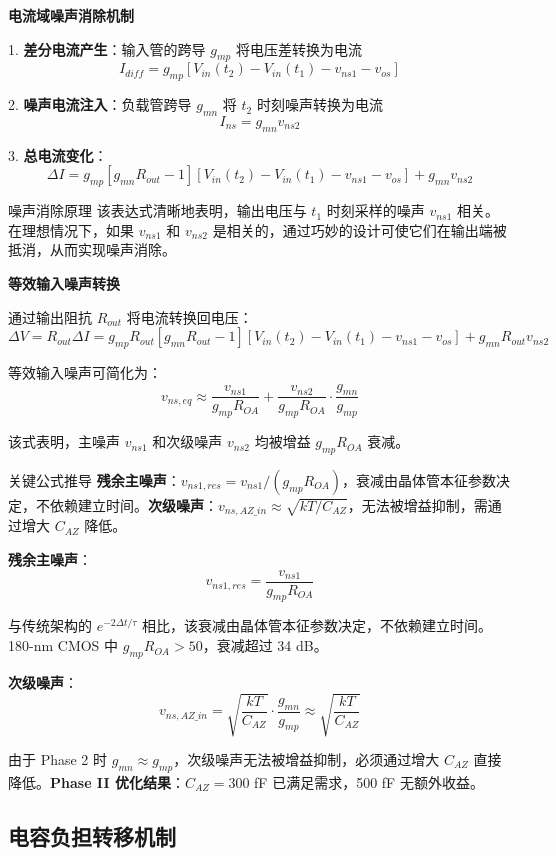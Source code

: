 \documentclass[11pt,a4paper,UTF8]{ctexart}
\begin{document}
\textbf{电流域噪声消除机制}

1. \textbf{差分电流产生}：输入管的跨导 $g_{mp}$ 将电压差转换为电流
   $$I_{diff} = g_{mp} [V_{in}(t_2) - V_{in}(t_1) - v_{ns1} - v_{os}]$$

2. \textbf{噪声电流注入}：负载管跨导 $g_{mn}$ 将 $t_2$ 时刻噪声转换为电流
   $$I_{ns} = g_{mn} v_{ns2}$$

3. \textbf{总电流变化}：
   $$\Delta I = g_{mp}[g_{mn}R_{out} - 1][V_{in}(t_2) - V_{in}(t_1) - v_{ns1} - v_{os}] + g_{mn}v_{ns2}$$

\begin{impbox}{噪声消除原理}
该表达式清晰地表明，输出电压与 $t_1$ 时刻采样的噪声 $v_{ns1}$ 相关。在理想情况下，如果 $v_{ns1}$ 和 $v_{ns2}$ 是相关的，通过巧妙的设计可使它们在输出端被抵消，从而实现噪声消除。
\end{impbox}

\textbf{等效输入噪声转换}

通过输出阻抗 $R_{out}$ 将电流转换回电压：
$$\Delta V = R_{out} \Delta I = g_{mp}R_{out}[g_{mn}R_{out} - 1][V_{in}(t_2) - V_{in}(t_1) - v_{ns1} - v_{os}] + g_{mn}R_{out}v_{ns2}$$

等效输入噪声可简化为：
$$v_{ns,eq} \approx \frac{v_{ns1}}{g_{mp}R_{OA}} + \frac{v_{ns2}}{g_{mp}R_{OA}} \cdot \frac{g_{mn}}{g_{mp}}$$

该式表明，主噪声 $v_{ns1}$ 和次级噪声 $v_{ns2}$ 均被增益 $g_{mp}R_{OA}$ 衰减。

\begin{prinbox}{关键公式推导}
\textbf{残余主噪声}：$v_{ns1,res} = v_{ns1}/(g_{mp}R_{OA})$，衰减由晶体管本征参数决定，不依赖建立时间。\textbf{次级噪声}：$v_{ns,AZ\_in} \approx \sqrt{kT/C_{AZ}}$，无法被增益抑制，需通过增大 $C_{AZ}$ 降低。
\end{prinbox}

\textbf{残余主噪声}：
$$v_{ns1,res} = \frac{v_{ns1}}{g_{mp}R_{OA}}$$

与传统架构的 $e^{-2\Delta t/\tau}$ 相比，该衰减由晶体管本征参数决定，不依赖建立时间。180-nm CMOS 中 $g_{mp}R_{OA} > 50$，衰减超过 34 dB。

\textbf{次级噪声}：
$$v_{ns,AZ\_in} = \sqrt{\frac{kT}{C_{AZ}}} \cdot \frac{g_{mn}}{g_{mp}} \approx \sqrt{\frac{kT}{C_{AZ}}}$$

由于 Phase 2 时 $g_{mn} \approx g_{mp}$，次级噪声无法被增益抑制，必须通过增大 $C_{AZ}$ 直接降低。\textbf{Phase II 优化结果}：$C_{AZ}=300$ fF 已满足需求，500 fF 无额外收益。

\subsection{电容负担转移机制}
\end{document}
